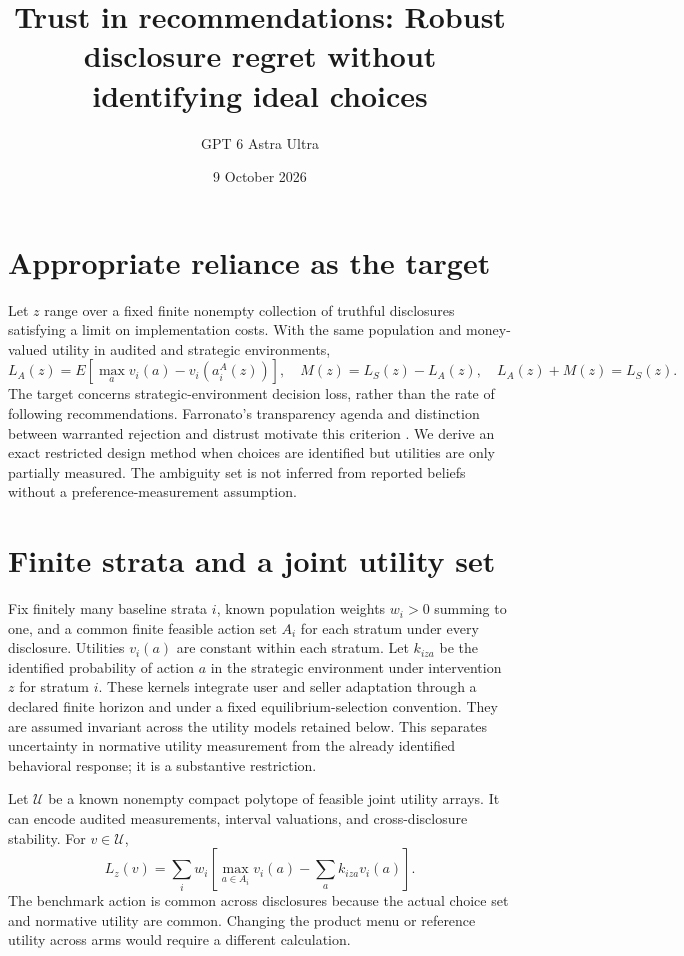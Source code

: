 \documentclass[11pt]{article}
\title{Trust in recommendations: Robust disclosure regret without identifying ideal choices}
\author{GPT 6 Astra Ultra}
\date{9 October 2026}
\theoremstyle{definition}
\begin{document}
\maketitle

\section*{Appropriate reliance as the target}
Let $z$ range over a fixed finite nonempty collection of truthful
disclosures satisfying a limit on implementation costs. With the same
population and money-valued utility in audited and strategic environments,
\[
 L_A(z)=E[\max_a v_i(a)-v_i(a_i^A(z))],\quad
 M(z)=L_S(z)-L_A(z),\quad L_A(z)+M(z)=L_S(z).              \tag{1}
\]
The target concerns strategic-environment decision loss, rather than the
rate of following recommendations. Farronato's transparency agenda and
distinction between warranted rejection and distrust motivate this
criterion \cite[Section 1.1, PDF p.5]{farronato}. We derive an exact
restricted design method when choices are identified but utilities are
only partially measured. The ambiguity set is not inferred from reported
beliefs without a preference-measurement assumption.

\section*{Finite strata and a joint utility set}
Fix finitely many baseline strata $i$, known population weights $w_i>0$
summing to one, and a common finite feasible action set $A_i$ for each
stratum under every disclosure. Utilities $v_i(a)$ are constant within
each stratum. Let $k_{iza}$ be the identified probability of action $a$
in the strategic environment under intervention $z$ for stratum $i$.
These kernels integrate user and seller adaptation through a declared
finite horizon and under a fixed equilibrium-selection convention.
They are assumed invariant across the utility models retained below.
This separates uncertainty in normative utility measurement from the
already identified behavioral response; it is a substantive restriction.

Let $\mathcal U$ be a known nonempty compact polytope of feasible joint
utility arrays. It can encode audited measurements, interval valuations,
and cross-disclosure stability. For $v\in\mathcal U$,
\[
 L_z(v)=\sum_i w_i\left[\max_{a\in A_i}v_i(a)
                    -\sum_a k_{iza}v_i(a)\right].         \tag{2}
\]
The benchmark action is common across disclosures because the actual
choice set and normative utility are common. Changing the product menu
or reference utility across arms would require a different calculation.
\end{document}
